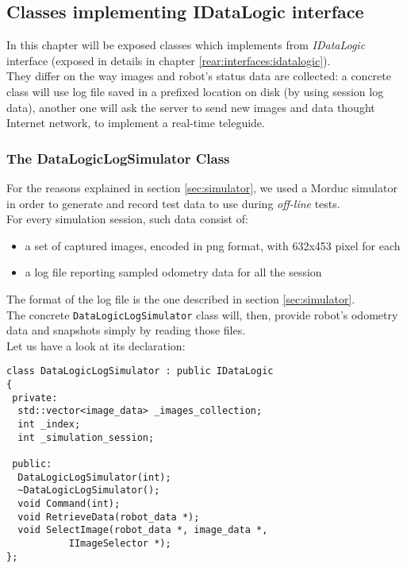 \subsection{Classes implementing IDataLogic interface}
\label{concr:idatalogic}

In this chapter will be exposed classes which implements
from \textit{IDataLogic} interface (exposed in details
in chapter \ref{rear:interfaces:idatalogic}).
\\
They differ on the way images
and robot's status data are collected: a concrete class
will use log file saved in a prefixed location on disk
(by using session log data),
another one will ask the server to send new images and data
thought Internet network, to implement a real-time teleguide.

\subsubsection{The DataLogicLogSimulator Class}
\label{concr:idatalogic:datalogiclogsimulator}

For the reasons explained in section \ref{sec:simulator}, 
we used a Morduc simulator in order to generate and record 
test data to use during \textit{off-line} tests.
\\
For every simulation session, such data consist of:

\begin{itemize}
  \item a set of captured images, encoded in png format,
    with 632x453 pixel for each
  \item a log file reporting sampled odometry data
    for all the session
\end{itemize}

The format of the log file is the one described in section 
\ref{sec:simulator}.
\\
The concrete \texttt{DataLogicLogSimulator} class will, then, provide 
robot's odometry data and snapshots simply by reading 
those files.
\\
Let us have a look at its declaration:

\begin{lstlisting}[caption={\texttt{DataLogic} declaration}, label={code:datalogic}, frame=trBL]
class DataLogicLogSimulator : public IDataLogic
{
 private:
  std::vector<image_data> _images_collection;
  int _index;
  int _simulation_session;
  
 public:
  DataLogicLogSimulator(int);
  ~DataLogicLogSimulator();
  void Command(int);
  void RetrieveData(robot_data *);
  void SelectImage(robot_data *, image_data *,
		   IImageSelector *);
};
\end{lstlisting}

